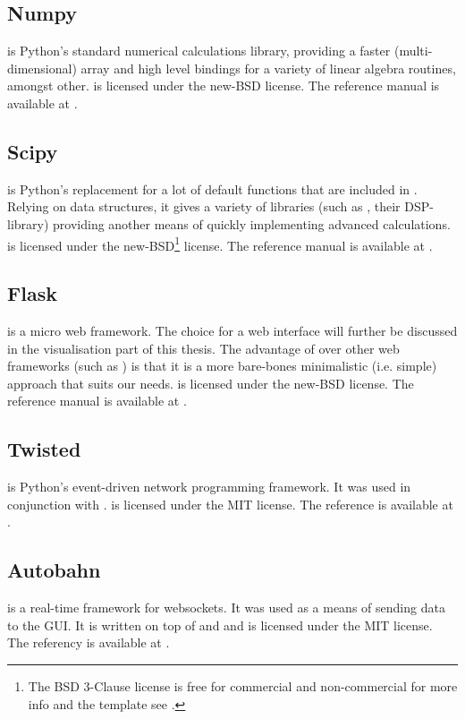 \documentclass[a4paper, openany, oneside]{memoir}
\begin{document}
\subsection{Numpy}
\label{sec:numpy}
 is Python's standard numerical calculations library, providing a faster (multi-dimensional) array and high level bindings for a variety of linear algebra routines, amongst other.  is licensed under the new-BSD license. The reference manual is available at \cite{numpyscipy}.

\subsection{Scipy}
\label{sec:scipy}
 is Python's replacement for a lot of default functions that are included in \matlab{}. Relying on  data structures, it gives a variety of libraries (such as , their DSP-library) providing another means of quickly implementing advanced calculations.  is licensed under the new-BSD\footnote{\label{fn:bsd}The BSD 3-Clause license is free for commercial and non-commercial for more info and the template see \cite{bsdlic}.} license. The reference manual is available at \cite{numpyscipy}.


\subsection{Flask}
\label{sec:flask}
 is a micro web framework. The choice for a web interface will further be discussed in the visualisation part of this thesis. The advantage of  over other web frameworks (such as ) is that it is a more bare-bones minimalistic (i.e. simple) approach that suits our needs.  is licensed under the new-BSD license. The reference manual is available at \cite{flask}.

\subsection{Twisted}
\label{sub:twisted}
 is Python's event-driven network programming framework. It was used in conjunction with .  is licensed under the MIT license. The reference is available at \cite{twisted}.

\subsection{Autobahn}
\label{sub:autobahn}
 is a real-time framework for websockets. It was used as a means of sending data to the GUI. It is written on top of  and  and is licensed under the MIT license. The referency is available at \cite{autobahn}.
\end{document}
